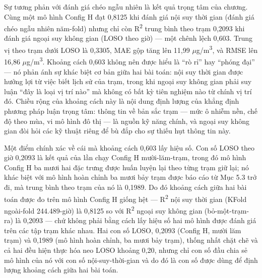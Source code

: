 Sự tương phản với đánh giá chéo ngẫu nhiên là kết quả trọng tâm của chương. Cùng một mô hình Config H đạt 0,8125 khi đánh giá nội suy thời gian (đánh giá chéo ngẫu nhiên năm-fold) nhưng chỉ còn R\textsuperscript{2} trung bình theo trạm 0,2093 khi đánh giá ngoại suy không gian (LOSO theo giờ) --- một chênh lệch 0,603. Trung vị theo trạm dưới LOSO là 0,3305, MAE gộp tăng lên 11,99 $\mu$g/m\textsuperscript{3}, và RMSE lên 16,86 $\mu$g/m\textsuperscript{3}. Khoảng cách 0,603 không nên được hiểu là ``rò rỉ'' hay ``phóng đại'' --- nó phản ánh sự khác biệt cơ bản giữa hai bài toán: nội suy thời gian được hưởng lợi từ việc biết lịch sử của trạm, trong khi ngoại suy không gian phải suy luận ``đây là loại vị trí nào'' mà không có bất kỳ tiên nghiệm nào từ chính vị trí đó. Chiều rộng của khoảng cách này là nội dung định lượng của khẳng định phương pháp luận trọng tâm: thông tin về bản sắc trạm --- mức ô nhiễm nền, chế độ theo mùa, vi mô hình đô thị --- là nguồn kỹ năng chính, và ngoại suy không gian đòi hỏi các kỹ thuật riêng để bù đắp cho sự thiếu hụt thông tin này.

Một điểm chính xác về cái mà khoảng cách 0,603 lấy hiệu số. Con số LOSO theo giờ 0,2093 là kết quả của lần chạy Config H mười-lăm-trạm, trong đó mô hình Config H ba mươi hai đặc trưng được huấn luyện lại theo từng trạm giữ lại; nó khác biệt với mô hình hoàn chỉnh ba mươi bảy trạm được báo cáo từ Mục 5.3 trở đi, mà trung bình theo trạm của nó là 0,1989. Do đó khoảng cách giữa hai bài toán được đo trên mô hình Config H giống hệt --- R\textsuperscript{2} nội suy thời gian (KFold ngoài-fold 244.489-giờ) là 0,8125 so với R\textsuperscript{2} ngoại suy không gian (bỏ-một-trạm-ra) là 0,2093 --- chứ không phải bằng cách lấy hiệu số hai mô hình được đánh giá trên các tập trạm khác nhau. Hai con số LOSO, 0,2093 (Config H, mười lăm trạm) và 0,1989 (mô hình hoàn chỉnh, ba mươi bảy trạm), thống nhất chặt chẽ và cả hai đều hiện thực hóa neo LOSO khoảng 0,20, nhưng chỉ con số đầu chia sẻ mô hình của nó với con số nội-suy-thời-gian và do đó là con số được dùng để định lượng khoảng cách giữa hai bài toán.

